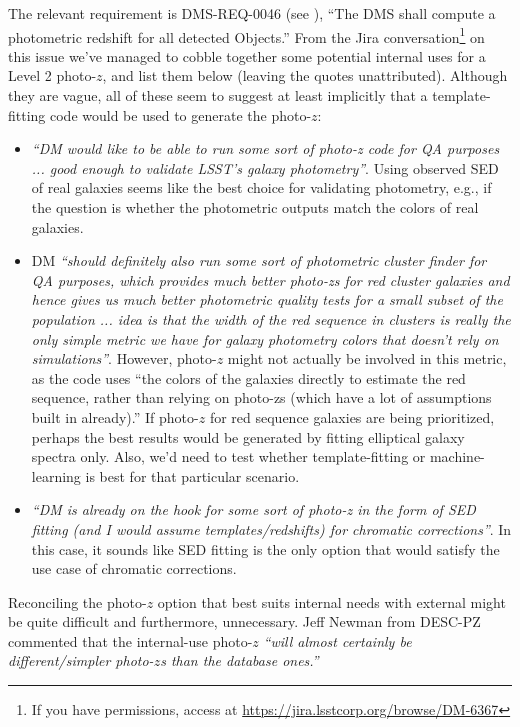 \documentclass[DM,lsstdraft,toc]{lsstdoc}
\begin{document}
The relevant requirement is DMS-REQ-0046 (see ), ``The DMS shall compute a photometric redshift for all detected Objects.'' From the Jira conversation\footnote{If you have permissions, access at \url{https://jira.lsstcorp.org/browse/DM-6367}} on this issue we've managed to cobble together some potential internal uses for a Level 2 photo-$z$, and list them below (leaving the quotes unattributed). Although they are vague, all of these seem to suggest at least implicitly that a template-fitting code would be used to generate the photo-$z$:
\begin{itemize}
\item {\it ``DM would like to be able to run some sort of photo-z code for QA purposes ... good enough to validate LSST's galaxy photometry''}. Using observed SED of real galaxies seems like the best choice for validating photometry, e.g., if the question is whether the photometric outputs match the colors of real galaxies.
\item DM {\it ``should definitely also run some sort of photometric cluster finder for QA purposes, which provides much better photo-zs for red cluster galaxies and hence gives us much better photometric quality tests for a small subset of the population ... idea is that the width of the red sequence in clusters is really the only simple metric we have for galaxy photometry colors that doesn't rely on simulations''}. However, photo-$z$ might not actually be involved in this metric, as the code uses ``the colors of the galaxies directly to estimate the red sequence, rather than relying on photo-zs (which have a lot of assumptions built in already).'' If photo-$z$ for red sequence galaxies are being prioritized, perhaps the best results would be generated by fitting elliptical galaxy spectra only. Also, we'd need to test whether template-fitting or machine-learning is best for that particular scenario.
\item {\it ``DM is already on the hook for some sort of photo-z in the form of SED fitting (and I would assume templates/redshifts) for chromatic corrections''}. In this case, it sounds like SED fitting is the only option that would satisfy the use case of chromatic corrections.
\end{itemize}

Reconciling the photo-$z$ option that best suits internal needs with external might be quite difficult and furthermore, unnecessary. Jeff Newman from DESC-PZ commented that the internal-use photo-$z$ \textit{``will almost certainly be different/simpler photo-$z$s than the database ones.''}
\end{document}

